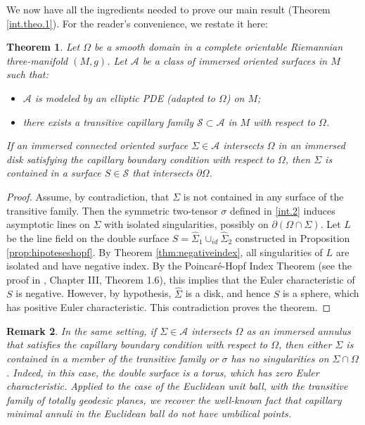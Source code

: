 \documentclass[11pt,reqno]{amsart}
\newtheorem{theorem}{Theorem}[section]
\newtheorem{rmk}[theorem]{Remark}
\begin{document}
We now have all the ingredients needed to prove our main result (Theorem \ref{int.theo.1}). For the reader's convenience, we restate it here:

\begin{theorem}\label{main.theorem}
Let $\Omega$ be a smooth domain in a complete orientable Riemannian three-manifold $(M,g)$. Let $\mathcal{A}$ be a class of immersed oriented surfaces in $M$ such that:
    \begin{itemize}
        \item $\mathcal{A}$ is modeled by an elliptic PDE (adapted to $\Omega$) on $M$;
        \item there exists a transitive capillary family $\mathcal{S}\subset\mathcal{A}$ in $M$ with respect to $\Omega$.
    \end{itemize}
 If an immersed connected oriented surface $\Sigma\in \mathcal{A}$ intersects $\Omega$ in an immersed disk satisfying the capillary boundary condition with respect to $\Omega$, then $\Sigma$ is contained in a surface $S\in \mathcal{S}$ that intersects $\partial \Omega$.
\end{theorem}

\begin{proof}
    Assume, by contradiction, that $\Sigma$ is not contained in any surface of the transitive family. Then the symmetric two-tensor $\sigma$ defined in \eqref{int.2} induces asymptotic lines on $\Sigma$ with isolated singularities, possibly on $\partial (\Omega\cap \Sigma)$. 
    Let $L$ be the line field on the double surface $S=\widehat{\Sigma}_1\cup_{id}\widehat{\Sigma}_2$ constructed in Proposition \ref{prop:hipoteseshopf}. By Theorem \ref{thm:negativeindex}, all singularities of $L$ are isolated and have negative index. 
    By the Poincaré-Hopf Index Theorem (see the proof in \cite{Hopf1946}, Chapter III, Theorem 1.6), this implies that the Euler characteristic of $S$ is negative. However, by hypothesis, $\widehat{\Sigma}$ is a disk, and hence $S$ is a sphere, which has positive Euler characteristic. This contradiction proves the theorem.
\end{proof}

\begin{rmk}
    In the same setting, if $\Sigma\in \mathcal{A}$ intersects $\Omega$ as an immersed annulus that satisfies the capillary boundary condition with respect to $\Omega$, then either $\Sigma$ is contained in a member of the transitive family or $\sigma$ has no singularities on $\Sigma\cap \Omega$. Indeed, in this case, the double surface is a torus, which has zero Euler characteristic. Applied to the case of the Euclidean unit ball, with the transitive family of totally geodesic planes, we recover the well-known fact that capillary minimal annuli in the Euclidean ball do not have umbilical points.
\end{rmk}
\end{document}
